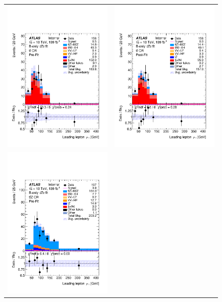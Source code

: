 \begin{figure}[htbp]
	\centering
	\begin{tabular}{cc}
		\includegraphics[width=.45\textwidth]{Chapters/CH7/figures/BONLY_CR_UsingDL1rcFullSys/Plots/TTCR} &
		\includegraphics[width=.45\textwidth]{Chapters/CH7/figures/BONLY_CR_UsingDL1rcFullSys/Plots/TTCR_postFit} \\
		\includegraphics[width=.45\textwidth]{Chapters/CH7/figures/BONLY_CR_UsingDL1rcFullSys/Plots/TTZCR} &

\end{tabular}
\end{figure}
